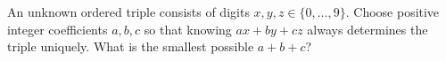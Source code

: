 An unknown ordered triple consists of digits $x,y,z\in\{0,\ldots,9\}$. Choose positive integer coefficients $a,b,c$ so that knowing $ax+by+cz$ always determines the triple uniquely. What is the smallest possible $a+b+c$?
